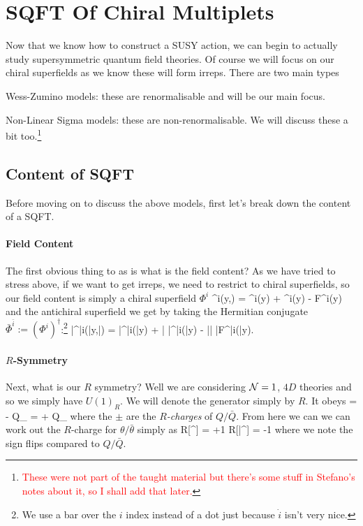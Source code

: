 \chapter{SQFT Of Chiral Multiplets}

Now that we know how to construct a SUSY action, we can begin to actually study supersymmetric quantum field theories. Of course we will focus on our chiral superfields as we know these will form irreps. There are two main types
\ben 
    \item Wess-Zumino models: these are renormalisable and will be our main focus.
    \item Non-Linear Sigma models: these are non-renormalisable. We will discuss these a bit too.\footnote{\textcolor{red}{These were not part of the taught material but there's some stuff in Stefano's notes about it, so I shall add that later.}}
\een

\section{Content of SQFT}

Before moving on to discuss the above models, first let's break down the content of a SQFT. 

\subsubsection{Field Content}

The first obvious thing to as is what is the field content? As we have tried to stress above, if we want to get irreps, we need to restrict to chiral superfields, so our field content is simply a chiral superfield $\Phi^i$
\bse 
    \Phi^i(y,\theta) = \phi^i(y) +  \theta\psi^i(y) - \theta\theta F^i(y) 
\ese 
and the antichiral superfield we get by taking the Hermitian conjugate $\bar{\Phi}^{\bar{i}} := (\Phi^i)^{\dagger}$:\footnote{We use a bar over the $i$ index instead of a dot just because $\dot{i}$ isn't very nice.}
\bse 
    \bar{\Phi}^{\bar{i}}(\bar{y},\bar{\theta}) = \bar{\phi}^{\bar{i}}(\bar{y}) +  \bar{\theta} \bar{\psi}^{\bar{i}}(\bar{y}) - \bar{\theta}\bar{\theta} \bar{F}^{\bar{i}}(\bar{y}). 
\ese 

\subsubsection{$R$-Symmetry}

Next, what is our $R$ symmetry? Well we are considering $\mathcal{N}=1$, $4D$ theories and so we simply have $U(1)_R$. We will denote the generator simply by $R$. It obeys
\bse
    [R,Q_{\a}] = - Q_{\a}  = + Q_{\a}
\ese 
where the $\pm$ are the \textit{$R$-charges} of $Q/\bar{Q}$. From here we can we can work out the $R$-charge for $\theta/\bar{\theta}$ simply as
\bse 
    R[\theta^{\a}] = +1   \qand R[\bar{\theta}^{\dot{\a}}] =  -1
\ese 
where we note the sign flips compared to $Q/\bar{Q}$.

